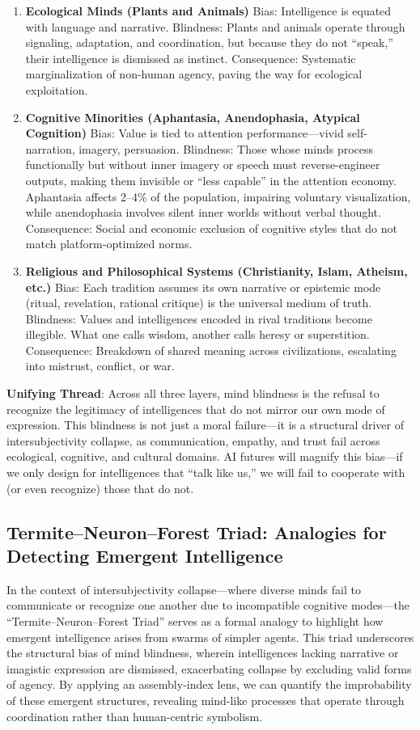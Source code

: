 \documentclass{article}
\begin{document}
\begin{enumerate}
    \item \textbf{Ecological Minds (Plants and Animals)} Bias: Intelligence is equated with language and narrative. Blindness: Plants and animals operate through signaling, adaptation, and coordination, but because they do not ``speak,'' their intelligence is dismissed as instinct. Consequence: Systematic marginalization of non-human agency, paving the way for ecological exploitation.
    \item \textbf{Cognitive Minorities (Aphantasia, Anendophasia, Atypical Cognition)} Bias: Value is tied to attention performance---vivid self-narration, imagery, persuasion. Blindness: Those whose minds process functionally but without inner imagery or speech must reverse-engineer outputs, making them invisible or ``less capable'' in the attention economy. Aphantasia affects 2--4\% of the population, impairing voluntary visualization, while anendophasia involves silent inner worlds without verbal thought. Consequence: Social and economic exclusion of cognitive styles that do not match platform-optimized norms.
    \item \textbf{Religious and Philosophical Systems (Christianity, Islam, Atheism, etc.)} Bias: Each tradition assumes its own narrative or epistemic mode (ritual, revelation, rational critique) is the universal medium of truth. Blindness: Values and intelligences encoded in rival traditions become illegible. What one calls wisdom, another calls heresy or superstition. Consequence: Breakdown of shared meaning across civilizations, escalating into mistrust, conflict, or war.
\end{enumerate}

\textbf{Unifying Thread}: Across all three layers, mind blindness is the refusal to recognize the legitimacy of intelligences that do not mirror our own mode of expression. This blindness is not just a moral failure---it is a structural driver of intersubjectivity collapse, as communication, empathy, and trust fail across ecological, cognitive, and cultural domains. AI futures will magnify this bias---if we only design for intelligences that ``talk like us,'' we will fail to cooperate with (or even recognize) those that do not.

\subsection{Termite--Neuron--Forest Triad: Analogies for Detecting Emergent Intelligence}
In the context of intersubjectivity collapse---where diverse minds fail to communicate or recognize one another due to incompatible cognitive modes---the ``Termite--Neuron--Forest Triad'' serves as a formal analogy to highlight how emergent intelligence arises from swarms of simpler agents. This triad underscores the structural bias of mind blindness, wherein intelligences lacking narrative or imagistic expression are dismissed, exacerbating collapse by excluding valid forms of agency. By applying an assembly-index lens, we can quantify the improbability of these emergent structures, revealing mind-like processes that operate through coordination rather than human-centric symbolism.
\end{document}
